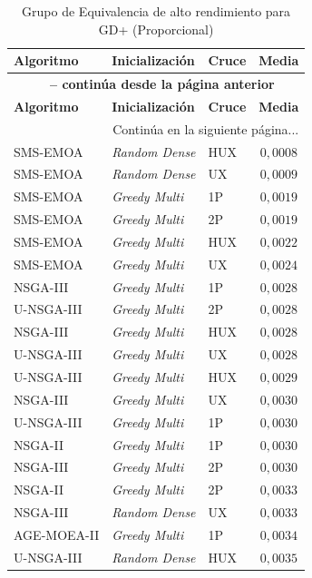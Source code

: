 \begin{longtable}{lllc}
    \caption{Grupo de Equivalencia de alto rendimiento para GD+ (Proporcional)}
    \label{tab:elite_gd_prop} \\
    \toprule
    \textbf{Algoritmo} & \textbf{Inicialización} & \textbf{Cruce} & \textbf{Media} \\
    \midrule
    \endfirsthead
    \multicolumn{4}{c}{{\bfseries \tablename\ \thetable{} -- continúa desde la página anterior}} \\
    \toprule
    \textbf{Algoritmo} & \textbf{Inicialización} & \textbf{Cruce} & \textbf{Media} \\
    \midrule
    \endhead
    \midrule \multicolumn{4}{r}{{Continúa en la siguiente página...}} \\
    \endfoot
    \bottomrule
    \endlastfoot
    SMS-EMOA & \textit{Random Dense} & HUX & $0{,}0008$ \\
SMS-EMOA & \textit{Random Dense} & UX & $0{,}0009$ \\
SMS-EMOA & \textit{Greedy Multi} & 1P & $0{,}0019$ \\
SMS-EMOA & \textit{Greedy Multi} & 2P & $0{,}0019$ \\
SMS-EMOA & \textit{Greedy Multi} & HUX & $0{,}0022$ \\
SMS-EMOA & \textit{Greedy Multi} & UX & $0{,}0024$ \\
NSGA-III & \textit{Greedy Multi} & 1P & $0{,}0028$ \\
U-NSGA-III & \textit{Greedy Multi} & 2P & $0{,}0028$ \\
NSGA-III & \textit{Greedy Multi} & HUX & $0{,}0028$ \\
U-NSGA-III & \textit{Greedy Multi} & UX & $0{,}0028$ \\
U-NSGA-III & \textit{Greedy Multi} & HUX & $0{,}0029$ \\
NSGA-III & \textit{Greedy Multi} & UX & $0{,}0030$ \\
U-NSGA-III & \textit{Greedy Multi} & 1P & $0{,}0030$ \\
NSGA-II & \textit{Greedy Multi} & 1P & $0{,}0030$ \\
NSGA-III & \textit{Greedy Multi} & 2P & $0{,}0030$ \\
NSGA-II & \textit{Greedy Multi} & 2P & $0{,}0033$ \\
NSGA-III & \textit{Random Dense} & UX & $0{,}0033$ \\
AGE-MOEA-II & \textit{Greedy Multi} & 1P & $0{,}0034$ \\
U-NSGA-III & \textit{Random Dense} & HUX & $0{,}0035$ \\

\end{longtable}
